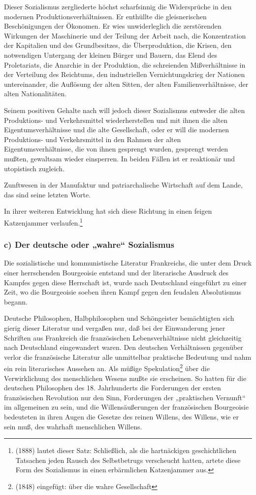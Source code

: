 \documentclass[letterpaper]{article}
\begin{document}
Dieser Sozialismus zergliederte höchst scharfsinnig die Widersprüche in den modernen Produktionsverhältnissen. Er enthüllte die gleisnerischen Beschönigungen der Ökonomen. Er wies unwiderleglich die zerstörenden Wirkungen der Maschinerie und der Teilung der Arbeit nach, die Konzentration der Kapitalien und des Grundbesitzes, die Überproduktion, die Krisen, den notwendigen Untergang der kleinen Bürger und Bauern, das Elend des Proletariats, die Anarchie in der Produktion, die schreienden Mißverhältnisse in der Verteilung des Reichtums, den industriellen Vernichtungskrieg der Nationen untereinander, die Auflösung der alten Sitten, der alten Familienverhältnisse, der alten Nationalitäten.

Seinem positiven Gehalte nach will jedoch dieser Sozialismus entweder die alten Produktions- und Verkehrsmittel wiederherstellen und mit ihnen die alten Eigentumsverhältnisse und die alte Gesellschaft, oder er will die modernen Produktions- und Verkehrsmittel in den Rahmen der alten Eigentumsverhältnisse, die von ihnen gesprengt wurden, gesprengt werden mußten, gewaltsam wieder einsperren. In beiden Fällen ist er reaktionär und utopistisch zugleich.

Zunftwesen in der Manufaktur und patriarchalische Wirtschaft auf dem Lande, das sind seine letzten Worte.

In ihrer weiteren Entwicklung hat sich diese Richtung in einen feigen Katzenjammer verlaufen.\footnote{(1888) lautet dieser Satz: Schließlich, als die hartnäckigen geschichtlichen Tatsachen jeden Rausch des Selbstbetrugs verscheucht hatten, artete diese Form des Sozialismus in einen erbärmlichen Katzenjammer aus.}

\subsubsection{c) Der deutsche oder „wahre“ Sozialismus}

Die sozialistische und kommunistische Literatur Frankreichs, die unter dem Druck einer herrschenden Bourgeoisie entstand und der literarische Ausdruck des Kampfes gegen diese Herrschaft ist, wurde nach Deutschland eingeführt zu einer Zeit, wo die Bourgeoisie soeben ihren Kampf gegen den feudalen Absolutismus begann.

Deutsche Philosophen, Halbphilosophen und Schöngeister bemächtigten sich gierig dieser Literatur und vergaßen nur, daß bei der Einwanderung jener Schriften aus Frankreich die französischen Lebensverhältnisse nicht gleichzeitig nach Deutschland eingewandert waren. Den deutschen Verhältnissen gegenüber verlor die französische Literatur alle unmittelbar praktische Bedeutung und nahm ein rein literarisches Aussehen an. Als müßige Spekulation\footnote{(1848) eingefügt: über die wahre Gesellschaft} über die Verwirklichung des menschlichen Wesens mußte sie erscheinen. So hatten für die deutschen Philosophen des 18. Jahrhunderts die Forderungen der ersten französischen Revolution nur den Sinn, Forderungen der „praktischen Vernunft“ im allgemeinen zu sein, und die Willensäußerungen der französischen Bourgeoisie bedeuteten in ihren Augen die Gesetze des reinen Willens, des Willens, wie er sein muß, des wahrhaft menschlichen Willens.
\end{document}
